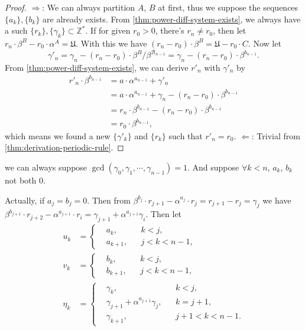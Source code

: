\begin{proof}
	$\Longrightarrow$: We can always partition $A$, $B$ at first, thus we suppose the sequences $\{a_k\}, \{b_k\}$ are already exists. From \cref{thm:power-diff-system-exists}, we always have a such  $\{r_k\}, \{\gamma_k\} \subset\mathbb{Z}^{*}$. If for given $r_0 > 0$, there's $r_n \ne r_0$, then let $r_n \cdot \beta^{B} - r_0 \cdot \alpha^{A} = \mathfrak{U}$. With this we have $(r_n - r_0)\cdot \beta^{B} = \mathfrak{U} - r_0\cdot C$. Now let
	\[ \gamma'_n = \gamma_n - (r_n - r_0)\cdot \beta^{B} / \beta^{\mathcal{B}_{n-1}} = \gamma_n -  (r_n - r_0)\cdot \beta^{b_{n-1}}. \]
	From \cref{thm:power-diff-system-exists}, we can derive $r'_n$ with $\gamma'_n$ by
	\begin{align*}
		r'_n\cdot\beta^{b_{n-1}} &= a\cdot\alpha^{a_{n-1}} + \gamma'_n \\
		&= a\cdot\alpha^{a_{n-1}} + \gamma_n - (r_n - r_0)\cdot \beta^{b_{n-1}} \\
		&= r_n \cdot\beta^{b_{n-1}} - (r_n - r_0)\cdot \beta^{b_{n-1}} \\
		&= r_0 \cdot \beta^{b_{n-1}},
	\end{align*}
	which means we found a new $\{\gamma'_k\}$ and $\{r_k\}$ such that $r'_n = r_0$.
	\newline
	$\Longleftarrow$: Trivial from \cref{thm:derivation-periodic-rule}.
\end{proof}
\begin{remark}
	we can always suppose $\gcd(\gamma_0, \gamma_1, \cdots, \gamma_{n-1}) = 1$. And suppose $\forall k < n$, $a_k$, $b_k$ not both $0$.
\end{remark}
Actually, if $a_{j} = b_{j} = 0$. Then from $\beta^{b_{j}}\cdot r_{j+1} - \alpha^{a_{j}} \cdot r_{j} = r_{j+1} - r_{j} = \gamma_{j}$ we have $\beta^{b_{j+1}}\cdot r_{j+2} - \alpha^{a_{j+1}} \cdot r_{i} = \gamma_{j+1} + \alpha^{a_{j+1}}\gamma_{i}$. Then let
\begin{align*}
	u_k &= \left\{\begin{aligned}
		&a_{k},  &&k < j, \\
		&a_{k+1}, && j < k < n-1,
	\end{aligned}\right.\\
	v_k &= \left\{\begin{aligned}
		&b_{k},  &&k < j, \\
		&b_{k+1}, && j < k < n-1,
	\end{aligned}\right.\\
	\eta_k &= \left\{\begin{aligned}
		&\gamma_{k},  &&k < j, \\
		&\gamma_{j+1} + \alpha^{a_{j+1}}\gamma_{j}, && k = j+1, \\
		&\gamma_{k+1}, && j+1 < k < n-1.
	\end{aligned}\right.
\end{align*}
